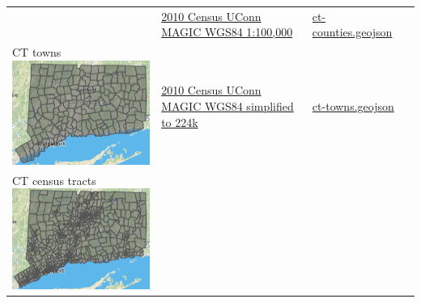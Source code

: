 \documentclass[
  english,
]{book}
\begin{document}
\begin{longtable}[]{@{}llll@{}}
\begin{minipage}[t]{0.28\columnwidth}
\end{minipage} & \begin{minipage}[t]{0.22\columnwidth}\raggedright
\href{http://magic.lib.uconn.edu/connecticut_data.html\#boundaries}{2010 Census UConn MAGIC WGS84 1:100,000}\strut
\end{minipage} & \begin{minipage}[t]{0.19\columnwidth}\raggedright
\href{data/ct-counties.geojson}{ct-counties.geojson}\strut
\end{minipage} & \begin{minipage}[t]{0.19\columnwidth}\raggedright
\strut
\end{minipage}\tabularnewline
\begin{minipage}[t]{0.28\columnwidth}\raggedright
CT towns \includegraphics{data/ct-towns.png}\strut
\end{minipage} & \begin{minipage}[t]{0.22\columnwidth}\raggedright
\href{http://magic.lib.uconn.edu/connecticut_data.html\#boundaries}{2010 Census UConn MAGIC WGS84 simplified to 224k}\strut
\end{minipage} & \begin{minipage}[t]{0.19\columnwidth}\raggedright
\href{data/ct-towns.geojson}{ct-towns.geojson}\strut
\end{minipage} & \begin{minipage}[t]{0.19\columnwidth}\raggedright
\strut
\end{minipage}\tabularnewline
\begin{minipage}[t]{0.28\columnwidth}\raggedright
CT census tracts \includegraphics{data/ct-tracts-2010.png}\strut

\end{minipage}
\end{longtable}
\end{document}
